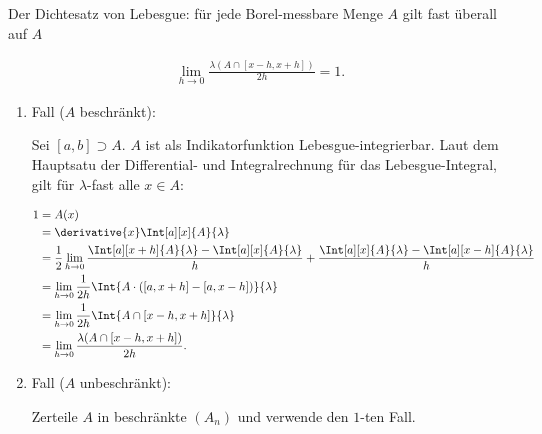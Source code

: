 
\begin{exercise}

Der Dichtesatz von Lebesgue:
für jede Borel-messbare Menge $A$ gilt fast überall auf $A$

\begin{align*}
    \lim_{h \to 0}
        \frac{\lambda(A \cap [x - h, x + h])}{2 h}
    =
    1.
\end{align*}

\end{exercise}


\begin{solution}

\phantom{}

\begin{enumerate}

    \item Fall ($A$ beschränkt):
    
    Sei $[a, b] \supset A$.
    $A$ ist als Indikatorfunktion Lebesgue-integrierbar.
    Laut dem Hauptsatu der Differential- und Integralrechnung für das Lebesgue-Integral, gilt für $\lambda$-fast alle $x \in A:$

    \begin{align*}
        1
        & =
        A(x) \\
        & =
        \derivative{x}
            \Int[a][x]{A}{\lambda} \\
        & =
        \frac{1}{2}
        \lim_{h \to 0}
            \frac
            {
                \Int[a][x + h]{A}{\lambda}
                -
                \Int[a][x]{A}{\lambda}
            }{h}
            +
            \frac
            {
                \Int[a][x]{A}{\lambda}
                -
                \Int[a][x - h]{A}{\lambda}
            }{h} \\
        & =
        \lim_{h \to 0}
            \frac{1}{2 h}
            \Int{A \cdot ([a, x + h] - [a, x - h])}{\lambda} \\
        & =
        \lim_{h \to 0}
            \frac{1}{2 h}
            \Int{A \cap [x - h, x + h]}{\lambda} \\
        & =
        \lim_{h \to 0}
            \frac{\lambda(A \cap [x - h, x + h])}{2 h}.
    \end{align*}

    \item Fall ($A$ unbeschränkt):
    
    Zerteile $A$ in beschränkte $(A_n)$ und verwende den $1$-ten Fall.

\end{enumerate}

\end{solution}

